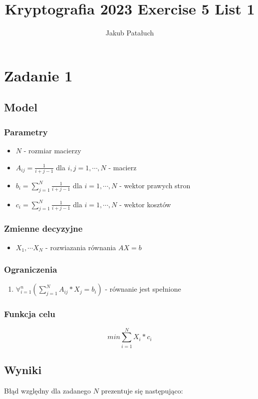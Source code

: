 \documentclass{article}
\title{Kryptografia 2023 Exercise 5 List 1}
\author{Jakub Patałuch}
\begin{document}
\section{Zadanie 1}
\subsection{Model}
\subsubsection{Parametry}
\begin{itemize}
    \item $N$ - rozmiar macierzy
    \item $A_{ij} = \frac{1}{i+j-1}$ dla $i,j={1,\cdots,N} $ - macierz
    \item $b_i = \sum_{j=1}^{N} \frac{1}{i+j-1}$ dla $i = {1,\cdots,N}$ - wektor prawych stron
    \item $c_i = \sum_{j=1}^{N} \frac{1}{i+j-1}$ dla $i = {1,\cdots,N}$ - wektor kosztów
\end{itemize}

\subsubsection{Zmienne decyzyjne}
\begin{itemize}
    \item $X_1, \cdots X_{N}$ - rozwiazania równania $AX=b$
\end{itemize}

\subsubsection{Ograniczenia}
\begin{enumerate}
    \item $\forall_{i=1}^{n} (\sum_{j=1}^{N} A_{ij} * X_{j} = b_{i})$ - równanie jest spełnione
\end{enumerate}

\subsubsection{Funkcja celu}
\[min \sum_{i=1}^{N} X_{i} * c_{i}\]

\subsection{Wyniki}
Błąd względny dla zadanego $N$ prezentuje się następująco:
\end{document}
